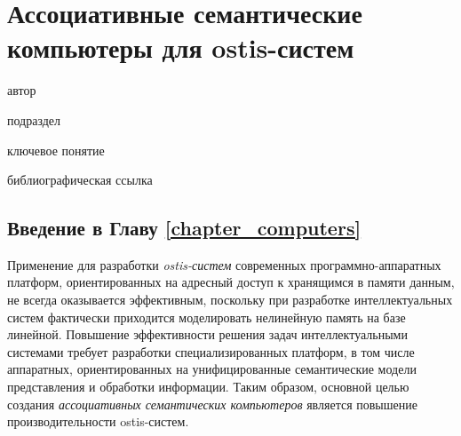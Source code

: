 \chapter{Ассоциативные семантические компьютеры для ostis-систем}
\label{chapter_computers}

\vspace{-7\baselineskip}

\begin{SCn}
\begin{scnrelfromlist}{автор}
\end{scnrelfromlist}

\bigskip


\bigskip

\begin{scnrelfromlist}{подраздел}
	\scnitem{***}
\end{scnrelfromlist}

\bigskip

\begin{scnrelfromlist}{ключевое понятие}
	\scnitem{***}
\end{scnrelfromlist}

\bigskip

\begin{scnrelfromlist}{библиографическая ссылка}
	\scnitem{***}
\end{scnrelfromlist}

\end{SCn}

\section*{Введение в Главу \ref{chapter_computers}}

Применение для разработки \textit{ostis-систем} современных программно-аппаратных платформ, ориентированных на адресный доступ к хранящимся в памяти данным, не всегда оказывается эффективным, поскольку при разработке интеллектуальных систем фактически приходится моделировать нелинейную память на базе линейной. Повышение эффективности решения задач интеллектуальными системами требует разработки специализированных платформ, в том числе аппаратных, ориентированных на унифицированные семантические модели представления и обработки информации. Таким образом, основной целью создания \textit{ассоциативных семантических компьютеров} является повышение производительности ostis-систем.

